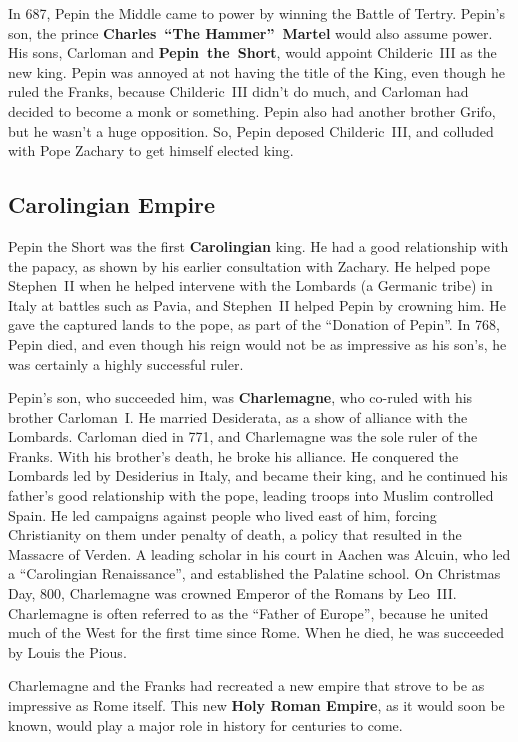 In 687, Pepin the Middle came to power by winning the Battle of Tertry.
Pepin's son, the prince \textbf{Charles~``The Hammer''~Martel} would also assume power.
His sons, Carloman and \textbf{Pepin~the~Short}, would appoint Childeric~III as the new king.
Pepin was annoyed at not having the title of the King, even though he ruled the Franks,
because Childeric~III didn't do much, and Carloman had decided to become a monk or something.
Pepin also had another brother Grifo, but he wasn't a huge opposition.
So, Pepin deposed Childeric~III, and colluded with Pope Zachary to get himself elected king.

\subsection*{Carolingian Empire}

Pepin the Short was the first \textbf{Carolingian} king.
He had a good relationship with the papacy, as shown by his earlier consultation with Zachary.
He helped pope Stephen~II when he helped intervene with the Lombards (a Germanic tribe)
in Italy at battles such as Pavia,
and Stephen~II helped Pepin by crowning him.
He gave the captured lands to the pope, as part of the ``Donation of Pepin''.
In 768, Pepin died, and even though his reign would not be as impressive as his son's,
he was certainly a highly successful ruler.

Pepin's son, who succeeded him, was \textbf{Charlemagne}, who co-ruled with his brother Carloman~I.
He married Desiderata, as a show of alliance with the Lombards.
Carloman died in 771, and Charlemagne was the sole ruler of the Franks.
With his brother's death, he broke his alliance.
He conquered the Lombards led by Desiderius in Italy, and became their king,
and he continued his father's good relationship with the pope,
leading troops into Muslim controlled Spain.
He led campaigns against people who lived east of him, forcing Christianity on them under penalty of death,
a policy that resulted in the Massacre of Verden.
A leading scholar in his court in Aachen was Alcuin,
who led a ``Carolingian Renaissance'', and established the Palatine school.
On Christmas Day, 800, Charlemagne was crowned Emperor of the Romans by Leo~III\@.
Charlemagne is often referred to as the ``Father of Europe'',
because he united much of the West for the first time since Rome.
When he died, he was succeeded by Louis the Pious.

Charlemagne and the Franks had recreated a new empire that strove to be as impressive as Rome itself.
This new \textbf{Holy Roman Empire}, as it would soon be known,
would play a major role in history for centuries to come.

